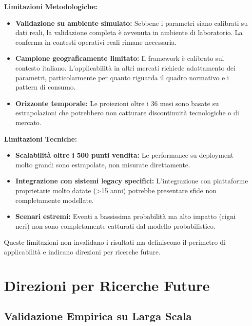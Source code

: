 \textbf{Limitazioni Metodologiche:}
\begin{itemize}
\item \textbf{Validazione su ambiente simulato:} Sebbene i parametri siano calibrati su dati reali, la validazione completa è avvenuta in ambiente di laboratorio. La conferma in contesti operativi reali rimane necessaria.

\item \textbf{Campione geograficamente limitato:} Il framework è calibrato sul contesto italiano. L'applicabilità in altri mercati richiede adattamento dei parametri, particolarmente per quanto riguarda il quadro normativo e i pattern di consumo.

\item \textbf{Orizzonte temporale:} Le proiezioni oltre i 36 mesi sono basate su estrapolazioni che potrebbero non catturare discontinuità tecnologiche o di mercato.
\end{itemize}

\textbf{Limitazioni Tecniche:}
\begin{itemize}
\item \textbf{Scalabilità oltre i 500 punti vendita:} Le performance su deployment molto grandi sono estrapolate, non misurate direttamente.

\item \textbf{Integrazione con sistemi legacy specifici:} L'integrazione con piattaforme proprietarie molto datate (>15 anni) potrebbe presentare sfide non completamente modellate.

\item \textbf{Scenari estremi:} Eventi a bassissima probabilità ma alto impatto (cigni neri) non sono completamente catturati dal modello probabilistico.
\end{itemize}

Queste limitazioni non invalidano i risultati ma definiscono il perimetro di applicabilità e indicano direzioni per ricerche future.

\section{\texorpdfstring{\textbf{Direzioni per Ricerche Future}}{5.7 - Direzioni per Ricerche Future}}
\label{sec:5.7}

\subsection{\texorpdfstring{\textbf{Validazione Empirica su Larga Scala}}{5.7.1 - Validazione Empirica su Larga Scala}}
\label{subsec:5.7.1}

